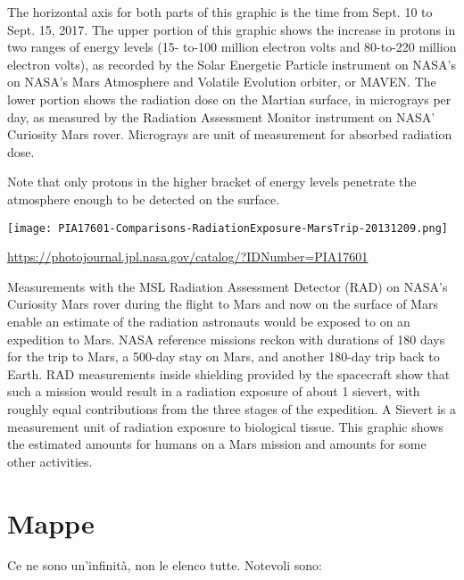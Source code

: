 \documentclass[a4paper,10pt,openany,oneside]{memoir}
\begin{document}
The horizontal axis for both parts of this graphic is the time from Sept. 10 to Sept. 15, 2017. The upper portion of this graphic shows the increase in protons in two ranges of energy levels (15- to-100 million electron volts and 80-to-220 million electron volts), as recorded by the Solar Energetic Particle instrument on NASA's on NASA's Mars Atmosphere and Volatile Evolution orbiter, or MAVEN. The lower portion shows the radiation dose on the Martian surface, in micrograys per day, as measured by the Radiation Assessment Monitor instrument on NASA' Curiosity Mars rover. Micrograys are unit of measurement for absorbed radiation dose.

Note that only protons in the higher bracket of energy levels penetrate the atmosphere enough to be detected on the surface.


\texttt{[image: PIA17601-Comparisons-RadiationExposure-MarsTrip-20131209.png]}

\url{https://photojournal.jpl.nasa.gov/catalog/?IDNumber=PIA17601}

Measurements with the MSL Radiation Assessment Detector (RAD) on NASA's Curiosity Mars rover during the flight to Mars and now on the surface of Mars enable an estimate of the radiation astronauts would be exposed to on an expedition to Mars. NASA reference missions reckon with durations of 180 days for the trip to Mars, a 500-day stay on Mars, and another 180-day trip back to Earth. RAD measurements inside shielding provided by the spacecraft show that such a mission would result in a radiation exposure of about 1 sievert, with roughly equal contributions from the three stages of the expedition. A Sievert is a measurement unit of radiation exposure to biological tissue. This graphic shows the estimated amounts for humans on a Mars mission and amounts for some other activities.

\section{Mappe}

Ce ne sono un'infinità, non le elenco tutte. Notevoli sono:
\end{document}
